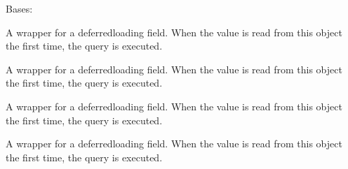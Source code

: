 \documentclass[letterpaper,10pt,spanish]{sphinxmanual}
\begin{document}
\begin{fulllineitems}
\begin{fulllineitems}
\pysigstartsignatures
{}
\pysigstopsignatures
\sphinxAtStartPar
Bases: 

\end{fulllineitems}



\begin{fulllineitems}

\pysigstartsignatures
{}
\pysigstopsignatures
\sphinxAtStartPar
A wrapper for a deferred\sphinxhyphen{}loading field. When the value is read from this
object the first time, the query is executed.

\end{fulllineitems}



\begin{fulllineitems}

\pysigstartsignatures
{}
\pysigstopsignatures
\sphinxAtStartPar
A wrapper for a deferred\sphinxhyphen{}loading field. When the value is read from this
object the first time, the query is executed.

\end{fulllineitems}



\begin{fulllineitems}

\pysigstartsignatures
{}
\pysigstopsignatures
\sphinxAtStartPar
A wrapper for a deferred\sphinxhyphen{}loading field. When the value is read from this
object the first time, the query is executed.

\end{fulllineitems}



\begin{fulllineitems}

\pysigstartsignatures
{}
\pysigstopsignatures
\sphinxAtStartPar
A wrapper for a deferred\sphinxhyphen{}loading field. When the value is read from this
object the first time, the query is executed.

\end{fulllineitems}



\begin{fulllineitems}


\end{fulllineitems}
\end{fulllineitems}
\end{document}
